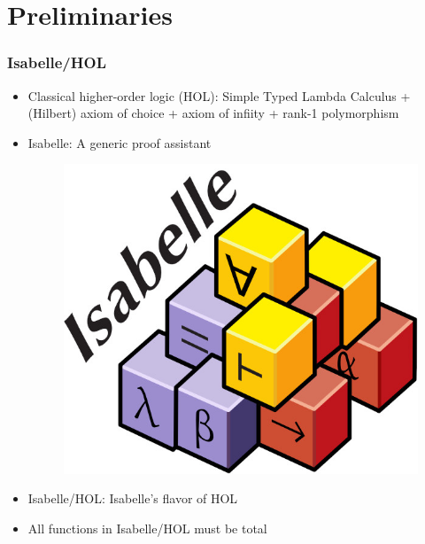 \documentclass[aspectratio=169,10pt]{beamer}
\begin{document}
\section{Preliminaries}
\begin{frame}[fragile]
  \frametitle{Isabelle/HOL}
  \begin{itemize}
    \item Classical higher-order logic (HOL): Simple Typed Lambda Calculus + (Hilbert) axiom of choice + axiom of infiity + rank-1 polymorphism
    \item Isabelle: A generic proof assistant
          \begin{figure}
            \centering
            \includegraphics[scale=0.15]{isabelle}
          \end{figure}
    \item Isabelle/HOL: Isabelle's flavor of HOL
    \item All functions in Isabelle/HOL must be total
  \end{itemize}
\end{frame}
\end{document}

